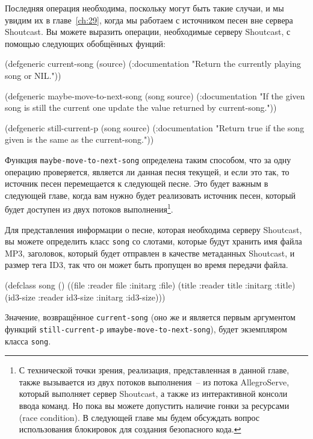Последняя операция необходима, поскольку могут быть такие случаи, и мы увидим их в
главе~\ref{ch:29}, когда мы работаем с источником песен вне сервера Shoutcast.  Вы можете
выразить операции, необходимые серверу Shoutcast, с помощью следующих обобщённых фунций:

\begin{myverb}
(defgeneric current-song (source)
  (:documentation "Return the currently playing song or NIL."))

(defgeneric maybe-move-to-next-song (song source)
  (:documentation
   "If the given song is still the current one update the value
returned by current-song."))

(defgeneric still-current-p (song source)
  (:documentation
   "Return true if the song given is the same as the current-song."))
\end{myverb}

Функция \lstinline{maybe-move-to-next-song} определена таким способом, что за одну
операцию проверяется, является ли данная песня текущей, и если это так, то источник песен
перемещается к следующей песне.  Это будет важным в следующей главе, когда вам нужно будет
реализовать источник песен, который будет доступен из двух потоков выполнения\footnote{С
  технической точки зрения, реализация, представленная в данной главе, также вызывается из
  двух потоков выполнения~-- из потока AllegroServe, который выполняет сервер Shoutcast, а
  также из интерактивной консоли ввода команд.  Но пока вы можете допустить наличие гонки
  за ресурсами (race condition).  В следующей главе мы будем обсуждать вопрос
  использования блокировок для создания безопасного кода.}.

Для представления информации о песне, которая необходима серверу Shoutcast, вы можете
определить класс \lstinline{song} со слотами, которые будут хранить имя файла MP3, заголовок,
который будет отправлен в качестве метаданных Shoutcast, и размер тега ID3, так что он
может быть пропущен во время передачи файла.

\begin{myverb}
(defclass song ()
  ((file     :reader file     :initarg :file)
   (title    :reader title    :initarg :title)
   (id3-size :reader id3-size :initarg :id3-size)))
\end{myverb}

Значение, возвращённое \lstinline{current-song} (оно же и является первым аргументом функций
\lstinline{still-current-p} и\lstinline{maybe-move-to-next-song}), будет экземпляром класса
\lstinline{song}.

